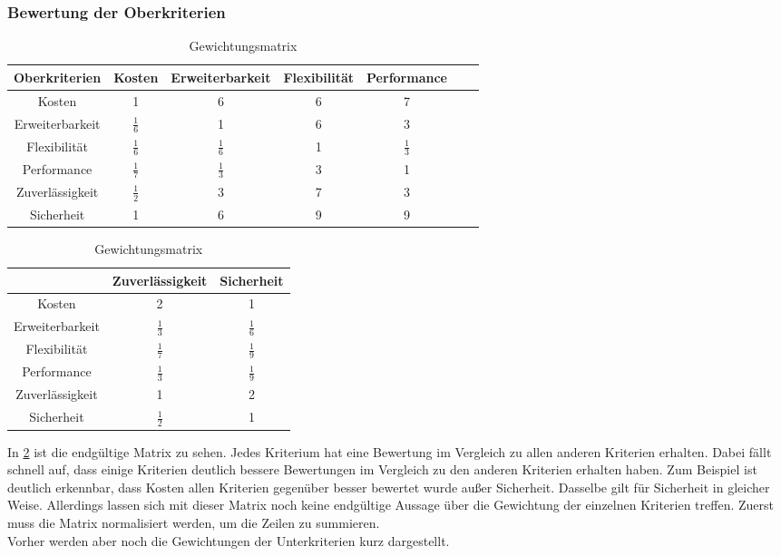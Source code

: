 \subsubsection{Bewertung der Oberkriterien}
\begin{table}[h!]
	\centering
	\begin{tabular}{c|cccccc}
		Oberkriterien   & Kosten			 & Erweiterbarkeit & Flexibilität & Performance   \\ 
		\hline
		Kosten          & 1     		      &        6        &       6      &      7      \\
		Erweiterbarkeit &   $\frac{1}{6}$     & 1               &       6      &      3      \\
		Flexibilität    &   $\frac{1}{6}$     &  $\frac{1}{6}$   & 1            &      $\frac{1}{3}$       \\
		Performance     &    $\frac{1}{7}$    &  $\frac{1}{3}$   &        3      & 1           \\
		Zuverlässigkeit &    $\frac{1}{2}$    &          3       &        7      &      3       \\
		Sicherheit      &    1   			  &        6         &        9      &       9             
	\end{tabular}
	\begin{tabular}{c|cc}
		 				&	Zuverlässigkeit & Sicherheit  \\ 
		\hline
		Kosten          &        2        &        1    \\
		Erweiterbarkeit &        $\frac{1}{3}$        &       $\frac{1}{6}$      \\
		Flexibilität    &        $\frac{1}{7}$         &      $\frac{1}{9}$       \\
		Performance     &        $\frac{1}{3}$         &      $\frac{1}{9}$       \\
		Zuverlässigkeit & 1               &      2       \\
		Sicherheit      &        $\frac{1}{2}$       & 1          
	\end{tabular}
	\caption{Gewichtungsmatrix}
	\label{all}
\end{table}
In \ref{all} ist die endgültige Matrix zu sehen. Jedes Kriterium hat eine Bewertung im Vergleich zu allen anderen Kriterien erhalten. Dabei fällt schnell auf, dass einige Kriterien deutlich bessere Bewertungen im Vergleich zu den anderen Kriterien erhalten haben. Zum Beispiel ist deutlich erkennbar, dass Kosten allen Kriterien gegenüber besser bewertet wurde außer Sicherheit. Dasselbe gilt für Sicherheit in gleicher Weise. Allerdings lassen sich mit dieser Matrix noch keine endgültige Aussage über die Gewichtung der einzelnen Kriterien treffen. Zuerst muss die Matrix normalisiert werden, um die Zeilen zu summieren.\\
Vorher werden aber noch die Gewichtungen der Unterkriterien kurz dargestellt.
